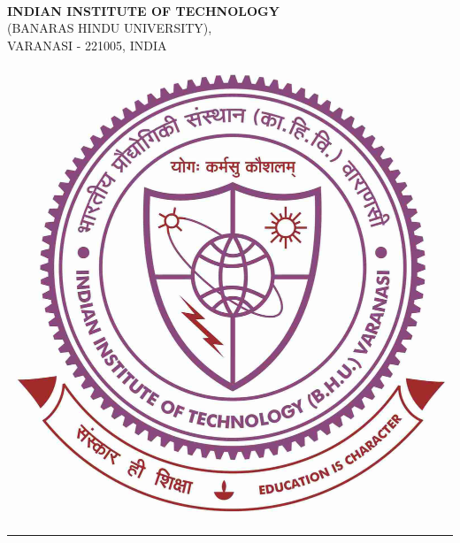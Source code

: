 \documentclass[11pt, a4paper, oneside]{Thesis} %
\theoremstyle{definition}
\begin{document}
\begin{minipage}{0.8\textwidth}
	\begin{flushleft} \large
	\centering
		\deptname\\
		\textbf{INDIAN INSTITUTE OF TECHNOLOGY}\\
		(BANARAS HINDU UNIVERSITY),\\
		VARANASI - 221005, INDIA
	\end{flushleft}
\end{minipage}
\hfill
\begin{minipage}{0.2\textwidth}
	{\begin{flushright}
	\includegraphics[scale=0.06]{Pictures/bhulogo}
	\end{flushright}}
\end{minipage}

\noindent\rule{\textwidth}{0.4pt}
\end{document}

